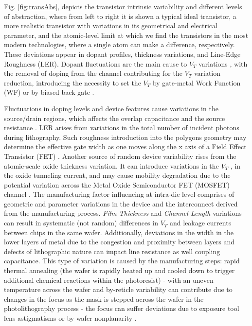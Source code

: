 \documentclass[diss,pgmicro,english]{iiufrgs}
\begin{document}
\begin{itemize}
Fig. \ref{fig:transAbs}, depicts the transistor intrinsic variability and different levels of abstraction, where from left to right it is shown a typical ideal transistor, a more realistic transistor with variations in its geometrical and electrical parameter, and the atomic-level limit at which we find the transistors in the most modern technologies, where a single atom can make a difference, respectively. These deviations appear in dopant profiles, thickness variations, and Line-Edge Roughness (LER). Dopant fluctuations are the main cause to $V_T$ variations \cite{asenov2003simulation}, with the removal of doping from the channel contributing for the $V_T$ variation reduction, introducing the necessity to set the $V_T$ by gate-metal Work Function (WF) or by biased back gate \cite{frank2001device,wong1999nanoscale}.

Fluctuations in doping levels and device features cause variations in the source/drain regions, which affects the overlap capacitance and the source resistance \cite{frank2000simulation}. LER arises from variations in the total number of incident photons during lithography. Such roughness introduction into the polygons geometry may determine the effective gate width as one moves along the x axis of a Field Effect Transistor (FET) \cite{brunner2003optical}. Another source of random device variability rises from the atomic-scale oxide thickness variation. It can introduce variations in the $V_T$ \cite{asenov2003simulation}, in the oxide tunneling current, and may cause mobility degradation due to the potential variation across the Metal Oxide Semiconductor FET (MOSFET) channel \cite{bernstein2006high}.
The manufacturing factor influencing at intra-die level comprises of geometric and parameter variations in the device and the interconnect derived from the manufacturing process. \textit{Film Thickness} and \textit{Channel Length} variations can result in systematic (not random) differences in $V_T$ and leakage currents between chips in the same wafer. Additionally, deviations in the width in the lower layers of metal due to the congestion and proximity between layers and defects of lithographic nature can impact line resistance as well coupling capacitance. This type of variation is caused by the manufacturing steps: rapid thermal annealing (the wafer is rapidly heated up and cooled down to trigger additional chemical reactions within the photoresist) - with an uneven temperature across the wafer and by-reticle variability can contribute due to changes in the focus as the mask is stepped across the wafer in the photolithography process - the focus can suffer deviations due to exposure tool lens astigmatisms or by wafer nonplanarity \cite{bernstein2006high, qian2015variability}.


\end{itemize}
\end{document}
